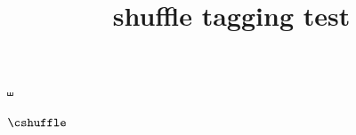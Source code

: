 \documentclass{article}
\title{shuffle tagging test}
\begin{document}
$\shuffle$

$\cshuffle$
\end{document}
